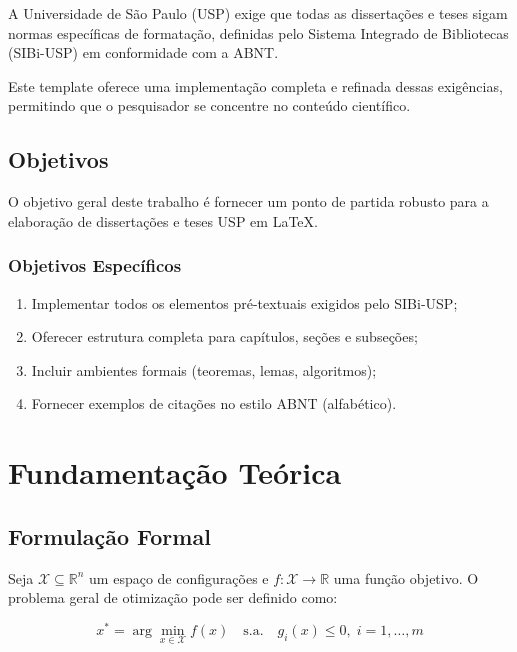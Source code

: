 \documentclass[
    12pt,                   %
    a4paper,                %
    openright,              %
    oneside,                %
    english,                %
    brazil                  %
]{abntex2}
\theoremstyle{plain}
\theoremstyle{definition}
\theoremstyle{remark}
\newcommand{\R}{\mathbb{R}}
\begin{document}
A Universidade de S\~ao Paulo (USP) exige que todas as
disserta\c{c}\~oes e teses sigam normas espec\'ificas de
formata\c{c}\~ao, definidas pelo Sistema Integrado de
Bibliotecas (SIBi-USP) em conformidade com a ABNT.

Este template oferece uma implementa\c{c}\~ao completa e
refinada dessas exig\^encias, permitindo que o pesquisador
se concentre no conte\'udo cient\'ifico.

\section{Objetivos}

O objetivo geral deste trabalho \'e fornecer um ponto de
partida robusto para a elabora\c{c}\~ao de disserta\c{c}\~oes
e teses USP em \LaTeX.

\subsection{Objetivos Espec\'ificos}

\begin{enumerate}
    \item Implementar todos os elementos pr\'e-textuais
        exigidos pelo SIBi-USP;
    \item Oferecer estrutura completa para cap\'itulos,
        se\c{c}\~oes e subse\c{c}\~oes;
    \item Incluir ambientes formais (teoremas, lemas,
        algoritmos);
    \item Fornecer exemplos de cita\c{c}\~oes no estilo
        ABNT (alfab\'etico).
\end{enumerate}

\chapter{Fundamenta\c{c}\~ao Te\'orica}
\label{chap:fund}

\section{Formula\c{c}\~ao Formal}

Seja $\mathcal{X} \subseteq \R^n$ um espa\c{c}o de
configura\c{c}\~oes e $f: \mathcal{X} \to \R$ uma fun\c{c}\~ao
objetivo. O problema geral de otimiza\c{c}\~ao pode ser
definido como:

\begin{equation}
    x^* = \arg\min_{x \in \mathcal{X}} f(x)
    \quad \text{s.a.} \quad g_i(x) \leq 0,\;
    i = 1, \dots, m
    \label{eq:otim}
\end{equation}
\end{document}
